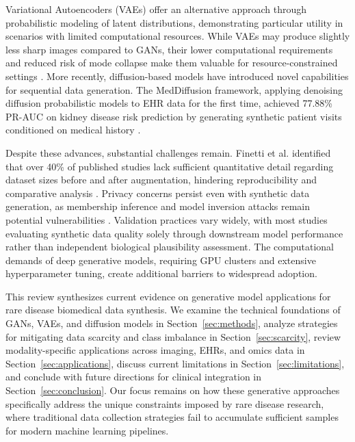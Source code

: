 Variational Autoencoders (VAEs) offer an alternative approach through probabilistic modeling of latent distributions, demonstrating particular utility in scenarios with limited computational resources. While VAEs may produce slightly less sharp images compared to GANs, their lower computational requirements and reduced risk of mode collapse make them valuable for resource-constrained settings \cite{mendes2025synthetic}. More recently, diffusion-based models have introduced novel capabilities for sequential data generation. The MedDiffusion framework, applying denoising diffusion probabilistic models to EHR data for the first time, achieved 77.88\% PR-AUC on kidney disease risk prediction by generating synthetic patient visits conditioned on medical history \cite{zhong2024meddiffusion}.

Despite these advances, substantial challenges remain. Finetti et al. identified that over 40\% of published studies lack sufficient quantitative detail regarding dataset sizes before and after augmentation, hindering reproducibility and comparative analysis \cite{finetti2025data}. Privacy concerns persist even with synthetic data generation, as membership inference and model inversion attacks remain potential vulnerabilities \cite{mendes2025synthetic}. Validation practices vary widely, with most studies evaluating synthetic data quality solely through downstream model performance rather than independent biological plausibility assessment. The computational demands of deep generative models, requiring GPU clusters and extensive hyperparameter tuning, create additional barriers to widespread adoption.

This review synthesizes current evidence on generative model applications for rare disease biomedical data synthesis. We examine the technical foundations of GANs, VAEs, and diffusion models in Section~\ref{sec:methods}, analyze strategies for mitigating data scarcity and class imbalance in Section~\ref{sec:scarcity}, review modality-specific applications across imaging, EHRs, and omics data in Section~\ref{sec:applications}, discuss current limitations in Section~\ref{sec:limitations}, and conclude with future directions for clinical integration in Section~\ref{sec:conclusion}. Our focus remains on how these generative approaches specifically address the unique constraints imposed by rare disease research, where traditional data collection strategies fail to accumulate sufficient samples for modern machine learning pipelines.

